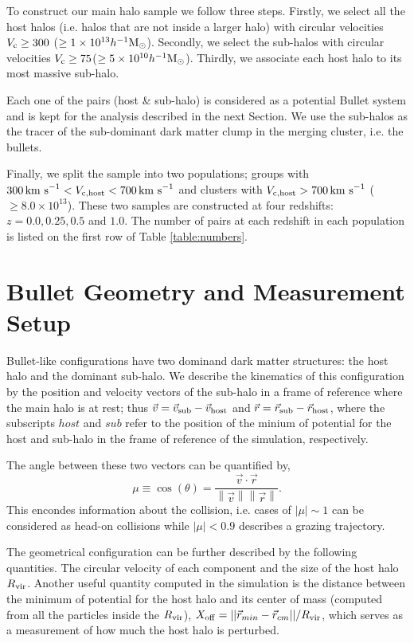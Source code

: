 \documentclass{emulateapj}
\newcommand{\hMsun}{{\ifmmode{h^{-1}{\rm {M_{\odot}}}}\else{$h^{-1}{\rm{M_{\odot}}}$}\fi}}
\newcommand{\kms}{{\ifmmode{{\mathrm{\,km\ s}^{-1}}}\else{\,km~s$^{-1}$}\fi}}
\begin{document}
To construct our main halo sample we follow three
steps. Firstly, we select all the host halos (i.e. halos that are not
inside a larger halo) with circular velocities $V_{\rm c}\geq 300$\kms
($\geq 1\times 10^{13} \hMsun$). Secondly, we select the sub-halos with
circular velocities $V_{\rm c}\geq 75$\kms ($\geq 5\times
10^{10}\hMsun$). Thirdly, we associate each host halo to its most
massive sub-halo. 


Each one of the pairs (host \& sub-halo) is considered as a
potential Bullet system and is kept for the analysis described in the
next Section. We use the sub-halos as the tracer of the sub-dominant
dark matter clump in the merging cluster, i.e. the bullets.  


Finally, we split the sample into two  populations; groups with
$300\kms < V_{\rm c, host}<700\kms$ and clusters with $V_{\rm
  c,host}>700\kms$ ($\geq 8.0\times 10^{13}$\hMsun). These two samples
are constructed at four redshifts: $z=0.0, 0.25, 0.5$ and $1.0$.  The
number of pairs at each redshift in each population is listed on the
first row of Table \ref{table:numbers}.  



\section{Bullet Geometry and Measurement Setup}
\label{sec:setup}

Bullet-like configurations have two dominand dark matter structures:
the host halo and the dominant sub-halo. We describe the kinematics of this configuration by the 
position and velocity vectors of the sub-halo in a frame of reference
where the main halo is at rest; thus
$\vec{v{}}=\vec{v}_{\rm sub}-\vec{v}_{\rm host}$ and
$\vec{r{}}=\vec{r}_{\rm sub}-\vec{r}_{\rm host}$, where the subscripts $host$
and $sub$ refer to the position of the minium of potential for the
host and sub-halo in the frame of reference of the simulation, respectively.  

The angle between these two vectors can be quantified by, 
\begin{equation}
  \mu\equiv
  \cos(\theta)=\frac{\vec{v{}}\cdotp{}\vec{r}}{\left\|\vec{v}{}\right\|
    \left\|\vec{r}\right\|} .
 \end{equation} 
%
This encondes information about the collision, i.e. cases of
$|\mu|\sim 1$ can be considered as head-on collisions while
$|\mu|< 0.9$ describes a grazing trajectory.  

The geometrical configuration can be further described by the
following quantities. The circular velocity of each component and the
size of the host halo $R_{\rm vir}$. Another useful quantity computed
in the simulation is the distance between the minimum of potential for
the host halo and its center of mass (computed from all the particles
inside the $R_{\rm vir}$), $X_{\rm
  off}=||\vec{r}_{min}-\vec{r}_{cm}||/R_{\rm vir}$, which serves as a measurement of how much the host halo is perturbed. 
\end{document}
